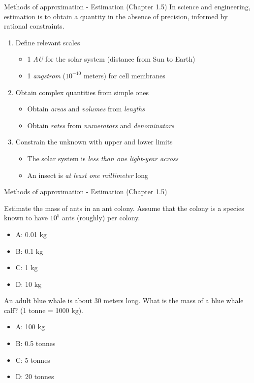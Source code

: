\documentclass{beamer}
\begin{document}
\begin{frame}{Methods of approximation - Estimation (Chapter 1.5)}
In science and engineering, \alert{estimation} is to obtain a quantity in the absence of precision, informed by rational constraints.
\begin{enumerate}
\item Define relevant \alert{scales}
\begin{itemize}
\item 1 \textit{AU} for the solar system (distance from Sun to Earth)
\item 1 \textit{angstrom} ($10^{-10}$ meters) for cell membranes
\end{itemize}
\item Obtain \alert{complex quantities} from simple ones
\begin{itemize}
\item Obtain \textit{areas} and \textit{volumes} from \textit{lengths}
\item Obtain \textit{rates} from \textit{numerators} and \textit{denominators}
\end{itemize}
\item Constrain the unknown with \alert{upper} and \alert{lower} limits
\begin{itemize}
\item The solar system is \textit{less than one light-year across}
\item An insect is \textit{at least one millimeter} long
\end{itemize}
\end{enumerate}
\end{frame}

\begin{frame}{Methods of approximation - Estimation (Chapter 1.5)}
\small
\begin{minipage}[b]{0.45\linewidth}
Estimate the mass of ants in an ant colony.  Assume that the colony is a species known to have $10^5$ ants (roughly) per colony.
\begin{itemize}
\item A: 0.01 kg
\item B: 0.1 kg
\item C: 1 kg
\item D: 10 kg
\end{itemize}
\end{minipage}
\hspace{0.5cm}
\begin{minipage}[b]{0.45\linewidth}
An adult blue whale is about 30 meters long.  What is the mass of a blue whale calf? (1 tonne = 1000 kg).
\vspace{0.55cm}
\begin{itemize}
\item A: 100 kg
\item B: 0.5 tonnes
\item C: 5 tonnes
\item D: 20 tonnes
\end{itemize}
\end{minipage}
\end{frame}
\end{document}
